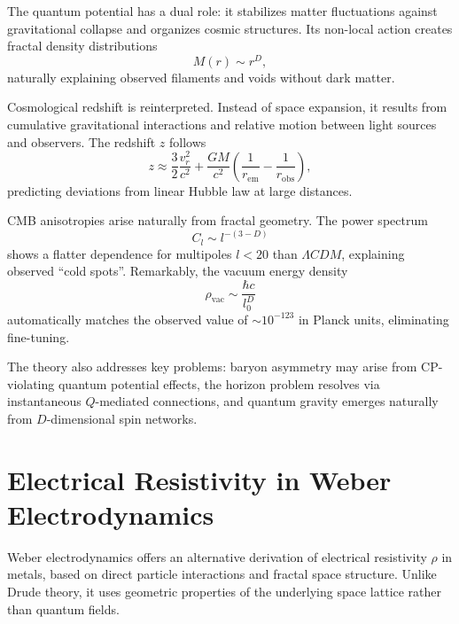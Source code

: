 The quantum potential has a dual role: it stabilizes matter fluctuations against gravitational collapse and organizes cosmic structures. Its non-local action creates fractal density distributions
\begin{equation}
    M(r) \sim r^D,
\end{equation}
naturally explaining observed filaments and voids without dark matter.

Cosmological redshift is reinterpreted. Instead of space expansion, it results from cumulative gravitational interactions and relative motion between light sources and observers. The redshift $z$ follows
\begin{equation}
    z \approx \frac{3}{2}\frac{v_r^2}{c^2} + \frac{GM}{c^2}\left(\frac{1}{r_{\text{em}}} - \frac{1}{r_{\text{obs}}}\right),
\end{equation}
predicting deviations from linear Hubble law at large distances.

CMB anisotropies arise naturally from fractal geometry. The power spectrum
\begin{equation}
    C_l \sim l^{-(3-D)}
\end{equation}
shows a flatter dependence for multipoles $l < 20$ than $\varLambda CDM$, explaining observed \enquote{cold spots}. Remarkably, the vacuum energy density
\begin{equation}
    \rho_{\text{vac}} \sim \frac{\hbar c}{l_0^D}
\end{equation}
automatically matches the observed value of $\sim 10^{-123}$ in Planck units, eliminating fine-tuning.

The theory also addresses key problems: baryon asymmetry may arise from CP-violating quantum potential effects, the horizon problem resolves via instantaneous $Q$-mediated connections, and quantum gravity emerges naturally from $D$-dimensional spin networks.

\section{Electrical Resistivity in Weber Electrodynamics}
\label{sec:weber_widerstand}

Weber electrodynamics offers an alternative derivation of electrical resistivity $\rho$ in metals, based on direct particle interactions and fractal space structure. Unlike Drude theory, it uses geometric properties of the underlying space lattice rather than quantum fields.

